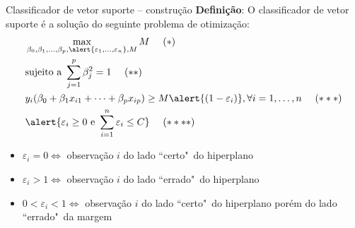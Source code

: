 
\begin{frame}{Classificador de vetor suporte -- construção}
    \textbf{Definição}: O classificador de vetor suporte é a solução do seguinte problema de otimização:
    \begin{align*}
        &\max_{\beta_0, \beta_1, \dots, \beta_p, \alert{\varepsilon_1, \dots, \varepsilon_n}, M} M  ~~~~ (*) \\ 
        &\text{sujeito a } \sum_{j = 1}^{p} \beta_j^2 = 1 ~~~~ (**)\\
        &y_i(\beta_0 + \beta_1 x_{i1} + \dots + \beta_p x_{ip}) \geq M\alert{(1 - \varepsilon_i)}, \forall i = 1, \dots, n ~~~~ (***) \\
        &\alert{\varepsilon_i \geq 0 \text{ e } \sum_{i = 1}^{n} \varepsilon_i \leq C} ~~~~ (****)
    \end{align*}
    
    \pause
    
    \begin{itemize}
        \item $\varepsilon_i = 0 \iff$ observação $i$ do lado ``certo"~do hiperplano
        
        \item $\varepsilon_i > 1 \iff$ observação $i$ do lado ``errado"~do hiperplano
        
        \item $0 < \varepsilon_i < 1 \iff$ observação $i$ do lado ``certo"~do hiperplano porém do lado ``errado"~da margem
    \end{itemize}
\end{frame}



